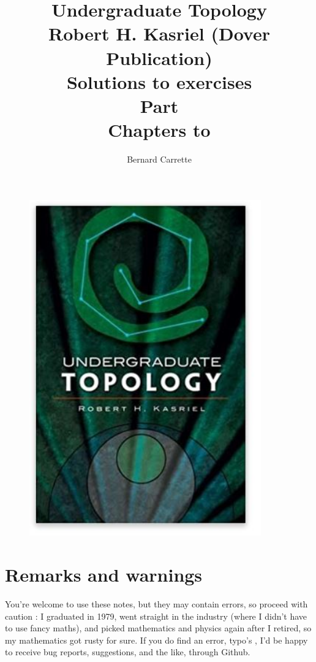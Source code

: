 \documentclass{thesis}
\author{Bernard Carrette}
\title{Undergraduate Topology\\Robert H. Kasriel (Dover Publication)\\ Solutions to exercises\\Part \RomanNumeralCaps{1}\\
Chapters \RomanNumeralCaps{1} to \RomanNumeralCaps{4}}
\begin{document}
\maketitle
\begin{figure}%
  \centering
  \includegraphics[width=10cm]{./images/zebook.jpg}
  \caption{}
  \label{fig:test}
\end{figure}

\section*{Remarks and warnings}
You're welcome to use these notes, but they may contain errors, so proceed with caution : I graduated in 1979, went straight in the industry (where I didn't have to use fancy maths), and picked mathematics and physics again after I retired, so my mathematics got rusty  for sure. If you do find an error, typo's , I'd be happy to receive bug reports, suggestions, and the like, through Github.
\newpage

\tableofcontents
\listoffigures


\printbibliography %
\end{document}
